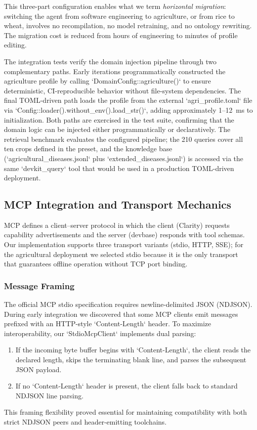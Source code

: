 This three-part configuration enables what we term \textit{horizontal migration}: switching the agent from software engineering to agriculture, or from rice to wheat, involves no recompilation, no model retraining, and no ontology rewriting. The migration cost is reduced from hours of engineering to minutes of profile editing.

The integration tests verify the domain injection pipeline through two complementary paths. Early iterations programmatically constructed the agriculture profile by calling `DomainConfig::agriculture()` to ensure deterministic, CI-reproducible behavior without file-system dependencies. The final TOML-driven path loads the profile from the external `agri\_profile.toml` file via `Config::loader().without\_env().load\_str()`, adding approximately 1--12~ms to initialization. Both paths are exercised in the test suite, confirming that the domain logic can be injected either programmatically or declaratively. The retrieval benchmark evaluates the configured pipeline; the 210 queries cover all ten crops defined in the preset, and the knowledge base (`agricultural\_diseases.jsonl` plus `extended\_diseases.jsonl`) is accessed via the same `devkit\_query` tool that would be used in a production TOML-driven deployment.

\subsection{MCP Integration and Transport Mechanics}

MCP defines a client--server protocol in which the client (Clarity) requests capability advertisements and the server (devbase) responds with tool schemas. Our implementation supports three transport variants (stdio, HTTP, SSE); for the agricultural deployment we selected stdio because it is the only transport that guarantees offline operation without TCP port binding.

\subsubsection{Message Framing}

The official MCP stdio specification requires newline-delimited JSON (NDJSON). During early integration we discovered that some MCP clients emit messages prefixed with an HTTP-style `Content-Length` header. To maximize interoperability, our `StdioMcpClient` implements dual parsing:
\begin{enumerate}[leftmargin=*]
    \item If the incoming byte buffer begins with `Content-Length`, the client reads the declared length, skips the terminating blank line, and parses the subsequent JSON payload.
    \item If no `Content-Length` header is present, the client falls back to standard NDJSON line parsing.
\end{enumerate}
This framing flexibility proved essential for maintaining compatibility with both strict NDJSON peers and header-emitting toolchains.

